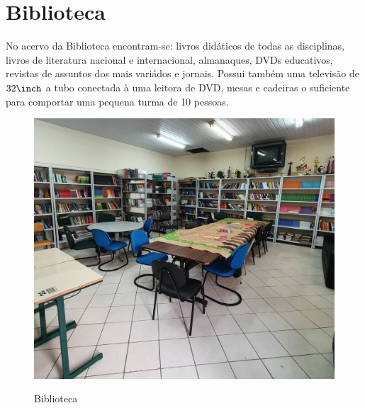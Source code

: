 \section{Biblioteca}
No acervo da Biblioteca encontram-se: livros didáticos de todas as disciplinas, livros de literatura nacional e internacional, almanaques, \acp{DVD} educativos, revistas de assuntos dos mais variádos e jornais. Possui também uma televisão de $32\inch$ a tubo conectada à uma leitora de \ac{DVD}, mesas e cadeiras o suficiente para comportar uma pequena turma de 10 pessoas.
\vfill
\begin{figure}[!ht]
    \begin{center}
        \includegraphics[width=.7\textwidth]{03-elementos/03.2_textual/03.2.1_fig/biblioteca01.jpg}       
        \label{fig:biblioteca}    
        \caption{Biblioteca}
    \end{center}    
\end{figure}



